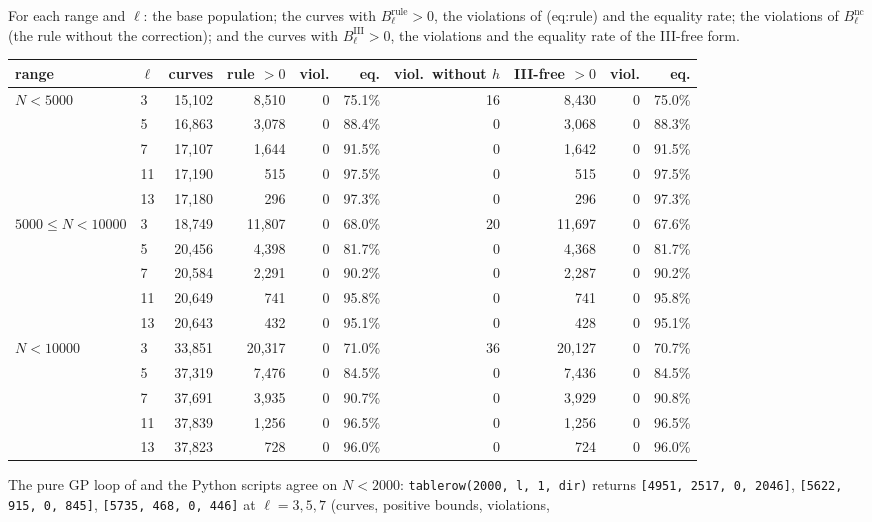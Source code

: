 \begin{sloppypar}
\begin{example}\label{ex:computation:repro-uniform}
For each range and $\ell$: the base population; the curves with $B^{\mathrm{rule}}_\ell>0$, the violations of (eq:rule) and the equality rate; the violations of
$B^{\mathrm{nc}}_\ell$ (the rule without the correction); and the curves with $B^{\mathrm{III}}_\ell>0$, the violations and the equality rate of the III-free form.
\begin{center}\footnotesize
\begin{tabular}{llrrrrrrrr}
\toprule
range & $\ell$ & curves & rule $>0$ & viol. & eq. & viol.\ without $h$ & III-free $>0$ & viol. & eq.\\
\midrule
$N<5000$ & 3 & 15,102 & 8,510 & 0 & 75.1\% & 16 & 8,430 & 0 & 75.0\%\\
 & 5 & 16,863 & 3,078 & 0 & 88.4\% & 0 & 3,068 & 0 & 88.3\%\\
 & 7 & 17,107 & 1,644 & 0 & 91.5\% & 0 & 1,642 & 0 & 91.5\%\\
 & 11 & 17,190 & 515 & 0 & 97.5\% & 0 & 515 & 0 & 97.5\%\\
 & 13 & 17,180 & 296 & 0 & 97.3\% & 0 & 296 & 0 & 97.3\%\\
$5000\le N<10000$ & 3 & 18,749 & 11,807 & 0 & 68.0\% & 20 & 11,697 & 0 & 67.6\%\\
 & 5 & 20,456 & 4,398 & 0 & 81.7\% & 0 & 4,368 & 0 & 81.7\%\\
 & 7 & 20,584 & 2,291 & 0 & 90.2\% & 0 & 2,287 & 0 & 90.2\%\\
 & 11 & 20,649 & 741 & 0 & 95.8\% & 0 & 741 & 0 & 95.8\%\\
 & 13 & 20,643 & 432 & 0 & 95.1\% & 0 & 428 & 0 & 95.1\%\\
$N<10000$ & 3 & 33,851 & 20,317 & 0 & 71.0\% & 36 & 20,127 & 0 & 70.7\%\\
 & 5 & 37,319 & 7,476 & 0 & 84.5\% & 0 & 7,436 & 0 & 84.5\%\\
 & 7 & 37,691 & 3,935 & 0 & 90.7\% & 0 & 3,929 & 0 & 90.8\%\\
 & 11 & 37,839 & 1,256 & 0 & 96.5\% & 0 & 1,256 & 0 & 96.5\%\\
 & 13 & 37,823 & 728 & 0 & 96.0\% & 0 & 724 & 0 & 96.0\%\\
\bottomrule
\end{tabular}
\end{center}
The pure GP loop of  and the Python scripts agree on $N<2000$: \texttt{tablerow(2000, l, 1, dir)} returns
\texttt{[4951, 2517, 0, 2046]}, \texttt{[5622, 915, 0, 845]}, \texttt{[5735, 468, 0, 446]} at $\ell=3,5,7$ (curves, positive bounds, violations,

\end{example}
\end{sloppypar}
